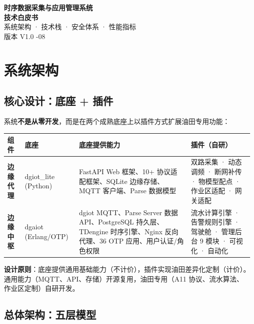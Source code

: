 \documentclass[11pt,a4paper]{ctexart}
\begin{document}
\begin{center}
{\Huge\bfseries 时序数据采集与应用管理系统\\[8pt] 技术白皮书}\\[14pt]
{\large 系统架构 · 技术栈 · 安全体系 · 性能指标}\\[8pt]
{\large 版本 V1.0 -08}
\end{center}
\vspace{1em}\noindent\hrulefill\vspace{1em}

\section{系统架构}

\subsection{核心设计：底座 + 插件}

系统\textbf{不是从零开发}，而是在两个成熟底座上以插件方式扩展油田专用功能：

\begin{table}[H]\centering
\begin{tabular}{p{2.8cm} p{4.2cm} p{4.2cm} p{3.0cm}}
\toprule
\textbf{组件} & \textbf{底座} & \textbf{底座提供能力} & \textbf{插件（自研）} \\
\midrule
\textbf{边缘代理} & dgiot\_lite (Python) & FastAPI Web 框架、10+ 协议适配框架、SQLite 边缘存储、MQTT 客户端、Parse 数据模型 & 双路采集 · 动态调频 · 断网补传 · 物模型配点 · 作业区适配 · 网关适配 \\
\textbf{边缘中枢} & dgaiot (Erlang/OTP) & dgiot MQTT、Parse Server 数据 API、PostgreSQL 持久层、TDengine 时序引擎、Nginx 反向代理、36 OTP 应用、用户认证/角色权限 & 流水计算引擎 · 告警规则引擎 · 驾驶舱 · 管理后台 9 模块 · 可视化 · 自动化 \\
\bottomrule
\end{tabular}
\end{table}

\textbf{设计原则}：底座提供通用基础能力（不计价），插件实现油田差异化定制（计价）。通用能力（MQTT、API、存储）开源复用，油田专用（A11 协议、流水算法、作业区定制）自研开发。

\subsection{总体架构：五层模型}
\end{document}
